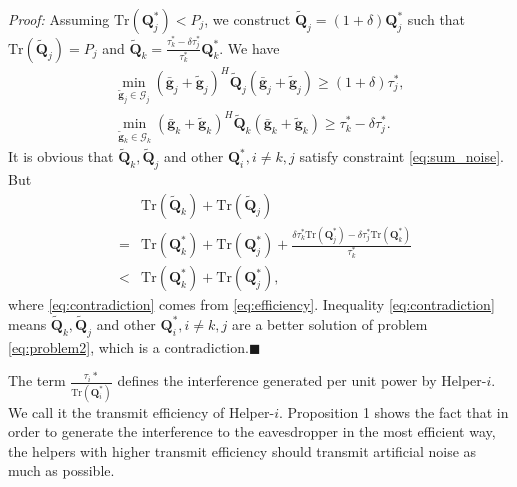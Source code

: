 \documentclass[journal]{IEEEtran}
\begin{document}
\emph{Proof:} Assuming $\mathrm{Tr}(\mathbf{Q}_j^*) < P_j$, we construct $\tilde{\mathbf{Q}}_j = (1 + \delta) \mathbf{Q}_j^*$ such that $\mathrm{Tr}(\tilde{\mathbf{Q}}_j) = P_j$ and $\tilde{\mathbf{Q}}_k = \frac{\tau_k^* - \delta\tau_j^*}{\tau_k^*} \mathbf{Q}_k^*$. We have
\begin{eqnarray}
\min_{\tilde{\mathbf{g}}_j \in \mathcal{G}_j}(\bar{\mathbf{g}}_j+\tilde{\mathbf{g}}_j)^H\tilde{\mathbf{Q}}_j(\bar{\mathbf{g}}_j+\tilde{\mathbf{g}}_j)\geq (1+ \delta)\tau_j^*,\\
\min_{\tilde{\mathbf{g}}_k \in \mathcal{G}_k}(\bar{\mathbf{g}}_k+\tilde{\mathbf{g}}_k)^H\tilde{\mathbf{Q}}_k(\bar{\mathbf{g}}_k+\tilde{\mathbf{g}}_k) \geq \tau_k^* - \delta\tau_j^*.
\end{eqnarray}
It is obvious that $\tilde{\mathbf{Q}}_k, \tilde{\mathbf{Q}}_j$ and other $\mathbf{Q}_i^*, i \neq k,j$ satisfy constraint \eqref{eq:sum_noise}. But
\begin{eqnarray}
&&\mathrm{Tr}(\tilde{\mathbf{Q}}_k) + \mathrm{Tr}(\tilde{\mathbf{Q}}_j)\\
&=&\mathrm{Tr}(\mathbf{Q}_k^*) + \mathrm{Tr}(\mathbf{Q}_j^*) + \frac{\delta\tau_k^*\mathrm{Tr}(\mathbf{Q}_j^*)-\delta\tau_j^*\mathrm{Tr}(\mathbf{Q}_k^*)}{\tau_k^*}\\
&<&\mathrm{Tr}(\mathbf{Q}_k^*) + \mathrm{Tr}(\mathbf{Q}_j^*), \label{eq:contradiction}
\end{eqnarray}
where \eqref{eq:contradiction} comes from  \eqref{eq:efficiency}.
Inequality \eqref{eq:contradiction} means $\tilde{\mathbf{Q}}_k, \tilde{\mathbf{Q}}_j$ and other $\mathbf{Q}_i^*, i \neq k,j$ are a better solution of problem \eqref{eq:problem2}, which is a contradiction.$\blacksquare$

The term $\frac{\tau_i*}{\mathrm{Tr}(\mathbf{Q}_i^*)}$ defines the interference generated per unit power by Helper-$i$. We call it the transmit efficiency of Helper-$i$. Proposition 1 shows the fact that in order to generate the interference to the eavesdropper in the most efficient way, the helpers with higher transmit efficiency should transmit artificial noise as much as possible.
\end{document}
